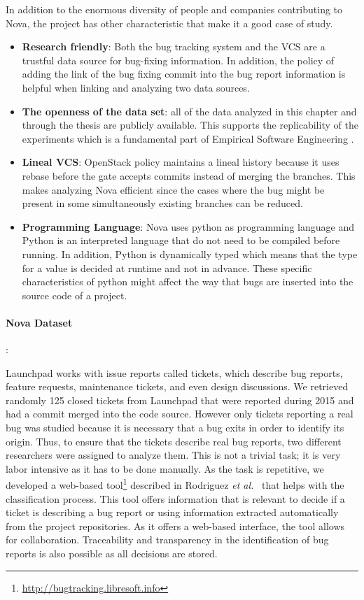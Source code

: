\documentclass[a4paper, 12pt]{book}
\begin{document}
In addition to the enormous diversity of people and companies contributing to Nova, the project has other characteristic that make it a good case of study.
\begin{itemize}
	\item \textbf{Research friendly}: Both the bug tracking system and the VCS are a trustful data source for bug-fixing information. In addition, the policy of adding the link of the bug fixing commit into the bug report information is helpful when linking and analyzing two data sources.
	\item \textbf{The openness of the data set}: all of the data analyzed in this chapter and through the thesis are publicly available. This supports the replicability of the experiments which is a fundamental part of  Empirical Software Engineering .
	\item \textbf{Lineal VCS}: OpenStack policy maintains a lineal history because it uses rebase before the gate accepts commits instead of merging the branches. This makes analyzing Nova efficient since the cases where the bug might be present in some simultaneously existing branches can be reduced.  
	\item \textbf{Programming Language}: Nova uses python as programming language and Python is an interpreted language that do not need to be compiled before running. In addition, Python is dynamically typed which means that the type for a value is decided at runtime and not in advance. These specific characteristics of python might affect the way that bugs are inserted into the source code of a project.
	\end{itemize}

\paragraph{Nova Dataset}:

Launchpad works with issue reports called tickets, which describe bug reports, feature requests, maintenance tickets, and even design discussions. We retrieved randomly 125 closed tickets from Launchpad that were reported during 2015 and had a commit merged into the code source. However only tickets reporting a real bug was studied because it is necessary that a bug exits in order to identify its origin. Thus, to ensure that the tickets describe real bug reports, two different researchers were assigned to analyze them. This is not a trivial task; it is very labor intensive as it has to be done manually. As the task is repetitive, we developed a web-based tool\footnote{\url{http://bugtracking.libresoft.info}} described in Rodriguez \emph{et al.}~\cite{rodriguez2016bugtracking} that helps with the classification process. This tool offers information that is relevant to decide if a ticket is describing a bug report or using information extracted automatically from the project repositories. As it offers a web-based interface, the tool allows for collaboration. Traceability and transparency in the identification of bug reports is also possible as all decisions are stored. 
\end{document}
